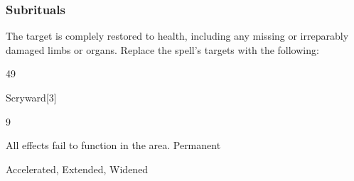 \subsubsection{Subrituals}
The target is complely restored to health, including any missing or irreparably damaged limbs or organs.
Replace the spell's targets with the following:
\begin{spellcontent}
\begin{augmenttargetinginfo}
 49
\end{augmenttargetinginfo}
\end{spellcontent}
\begin{spellsection}{Scryward}[3]
\begin{spellcontent}
\begin{spelltargetinginfo}
 9
\end{spelltargetinginfo}
\begin{spelleffects}
\spelleffect
All  effects fail to function in the area.
\spelldur Permanent
\end{spelleffects}
\end{spellcontent}
\begin{spellfooter}
 Accelerated, Extended, Widened
\end{spellfooter}
\begin{spellsubcontent}
\end{spellsubcontent}
\end{spellsection}
